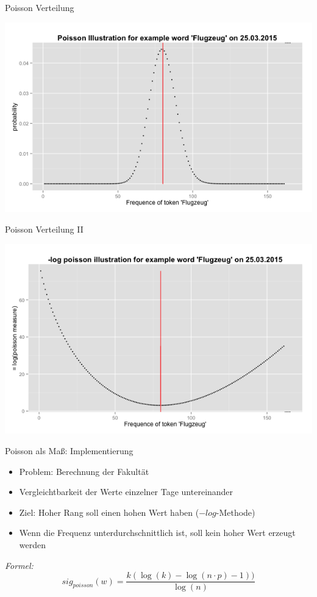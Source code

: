 \documentclass{beamer}
\begin{document}
\begin{frame}{Poisson Verteilung}
	  \begin{centering}
	  \includegraphics[width=1\textwidth]{pictures/poissonVerteilungFlugzeug.png}
	\end{centering}
\end{frame}
\begin{frame}{Poisson Verteilung II}
	  \begin{centering}
	  \includegraphics[width=1\textwidth]{pictures/logPoissonVerteilungFlugzeug.png}
	\end{centering}
\end{frame}


\begin{frame}{Poisson als Ma\ss : Implementierung}
	\begin{itemize}
 		\item Problem: Berechnung der Fakult\"at
 		\item Vergleichtbarkeit der Werte einzelner Tage untereinander 
 		\item Ziel: Hoher Rang soll einen hohen Wert haben ($-log$-Methode)
		\item Wenn die Frequenz unterdurchschnittlich ist, soll kein hoher Wert erzeugt werden
	 \end{itemize}
	 \emph{Formel:}
	 \begin{equation}
		sig_{poisson}(w) = \frac{k(\log(k)-\log(n\cdot p) -1 ))}{\log(n)}
	\end{equation}
\end{frame}
\end{document}
